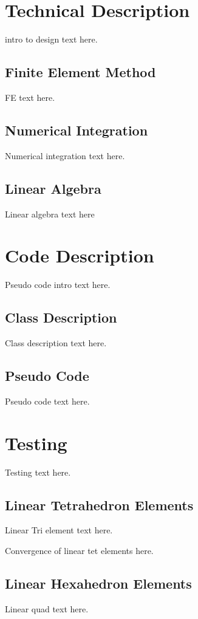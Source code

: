 \documentclass[a4paper, 12pt]{article}
\begin{document}
\section{Technical Description} \label{sec:techDes}
intro to design text here.

\subsection{Finite Element Method} \label{subsec:fem}
FE text here.

\subsection{Numerical Integration} \label{subsec:numInt}
Numerical integration text here.

\subsection{Linear Algebra} \label{subsec:LinAlg}
Linear algebra text here

\section{Code Description} \label{sec:codeDes}
Pseudo code intro text here.

\subsection{Class Description} \label{subsec:class}
Class description text here.

\subsection{Pseudo Code} \label{subsec:pseudo}
Pseudo code text here.

\section{Testing} \label{sec:testing}
Testing text here.

\subsection{Linear Tetrahedron Elements} \label{subsec:linTet}
Linear Tri element text here.

Convergence of linear tet elements here.

\subsection{Linear Hexahedron Elements} \label{subsec:linHex}
Linear quad text here.
\end{document}
